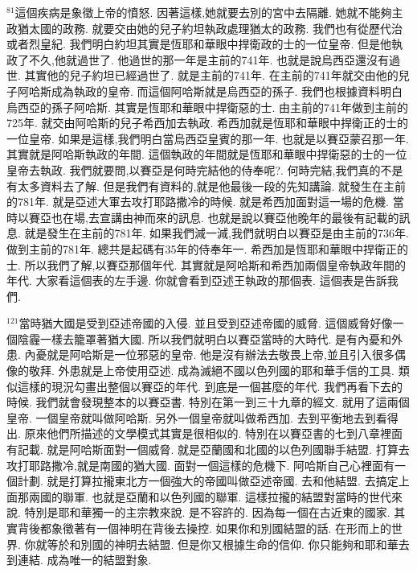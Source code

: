 \documentclass{book}
\begin{document}
$^{81}$這個疾病是象徵上帝的憤怒.
因著這樣,她就要去別的宮中去隔離.
她就不能夠主政猶太國的政務.
就要交由她的兒子約坦執政處理猶太的政務.
我們也有從歷代治或者烈皇紀.
我們明白約坦其實是恆耶和華眼中捍衛政的士的一位皇帝.
但是他執政了不久,他就過世了.
他過世的那一年是主前的741年.
也就是說烏西亞還沒有過世.
其實他的兒子約坦已經過世了.
就是主前的741年.
在主前的741年就交由他的兒子阿哈斯成為執政的皇帝.
而這個阿哈斯就是烏西亞的孫子.
我們也根據資料明白烏西亞的孫子阿哈斯.
其實是恆耶和華眼中捍衛惡的士.
由主前的741年做到主前的725年.
就交由阿哈斯的兒子希西加去執政.
希西加就是恆耶和華眼中捍衛正的士的一位皇帝.
如果是這樣,我們明白當烏西亞皇賓的那一年.
也就是以賽亞蒙召那一年.
其實就是阿哈斯執政的年間.
這個執政的年間就是恆耶和華眼中捍衛惡的士的一位皇帝去執政.
我們就要問,以賽亞是何時完結他的侍奉呢?.
何時完結,我們真的不是有太多資料去了解.
但是我們有資料的,就是他最後一段的先知講論.
就發生在主前的781年.
就是亞述大軍去攻打耶路撒冷的時候.
就是希西加面對這一場的危機.
當時以賽亞也在場,去宣講由神而來的訊息.
也就是說以賽亞他晚年的最後有記載的訊息.
就是發生在主前的781年.
如果我們減一減,我們就明白以賽亞是由主前的736年.
做到主前的781年.
總共是起碼有35年的侍奉年一.
希西加是恆耶和華眼中捍衛正的士.
所以我們了解,以賽亞那個年代.
其實就是阿哈斯和希西加兩個皇帝執政年間的年代.
大家看這個表的左手邊.
你就會看到亞述王執政的那個表.
這個表是告訴我們.

$^{121}$當時猶大國是受到亞述帝國的入侵.
並且受到亞述帝國的威脅.
這個威脅好像一個陰霾一樣去籠罩著猶大國.
所以我們就明白以賽亞當時的大時代.
是有內憂和外患.
內憂就是阿哈斯是一位邪惡的皇帝.
他是沒有辦法去敬畏上帝,並且引入很多偶像的敬拜.
外患就是上帝使用亞述.
成為滅絕不國以色列國的耶和華手信的工具.
類似這樣的現況勾畫出整個以賽亞的年代.
到底是一個甚麼的年代.
我們再看下去的時候.
我們就會發現整本的以賽亞書.
特別在第一到三十九章的經文.
就用了這兩個皇帝.
一個皇帝就叫做阿哈斯.
另外一個皇帝就叫做希西加.
去到平衡地去到看得出.
原來他們所描述的文學模式其實是很相似的.
特別在以賽亞書的七到八章裡面有記載.
就是阿哈斯面對一個威脅.
就是亞蘭國和北國的以色列國聯手結盟.
打算去攻打耶路撒冷,就是南國的猶大國.
面對一個這樣的危機下.
阿哈斯自己心裡面有一個計劃.
就是打算拉攏東北方一個強大的帝國叫做亞述帝國.
去和他結盟.
去搞定上面那兩國的聯軍.
也就是亞蘭和以色列國的聯軍.
這樣拉攏的結盟對當時的世代來說.
特別是耶和華獨一的主宗教來說.
是不容許的.
因為每一個在古近東的國家.
其實背後都象徵著有一個神明在背後去操控.
如果你和別國結盟的話.
在形而上的世界.
你就等於和別國的神明去結盟.
但是你又根據生命的信仰.
你只能夠和耶和華去到連結.
成為唯一的結盟對象.
\end{document}
